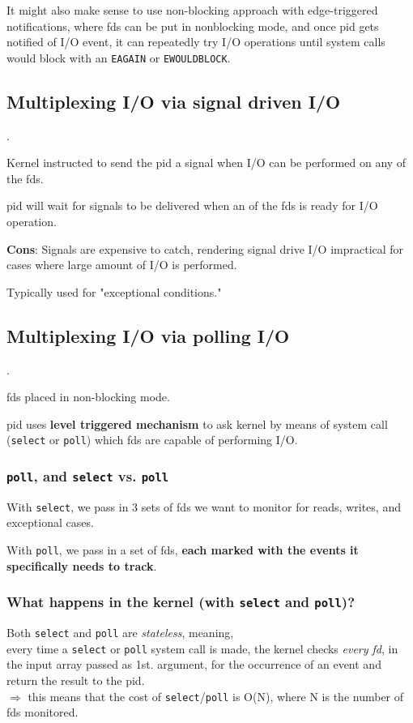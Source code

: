 \documentclass[10pt]{amsart}
\begin{document}
\begin{multicols*}{2}
It might also make sense to use non-blocking approach with edge-triggered notifications, where fds can be put in nonblocking mode, and once pid gets notified of I/O event, it can repeatedly try I/O operations until system calls would block with an \texttt{EAGAIN} or \texttt{EWOULDBLOCK}. 

\subsection{Multiplexing I/O via signal driven I/O}.

Kernel instructed to send the pid a signal when I/O can be performed on any of the fds.

pid will wait for signals to be delivered when an of the fds is ready for I/O operation.

\textbf{Cons}: Signals are expensive to catch, rendering signal drive I/O impractical for cases where large amount of I/O is performed.

Typically used for "exceptional conditions."

\subsection{Multiplexing I/O via polling I/O}.

fds placed in non-blocking mode.

pid uses \textbf{level triggered mechanism} to ask kernel by means of system call (\texttt{select} or \texttt{poll}) which fds are capable of performing I/O. 

\subsubsection{\texttt{poll}, and \texttt{select} vs. \texttt{poll} }

With \texttt{select}, we pass in 3 sets of fds we want to monitor for reads, writes, and exceptional cases.

With \texttt{poll}, we pass in a set of fds, \textbf{each marked with the events it specifically needs to track}.

\subsubsection{What happens in the kernel (with \texttt{select} and \texttt{poll})?}

Both \texttt{select} and \texttt{poll} are \emph{stateless}, meaning, \\
every time a \texttt{select} or \texttt{poll} system call is made, the kernel checks \emph{every fd}, in the input array passed as 1st. argument, for the occurrence of an event and return the result to the pid. \\
$\Longrightarrow$ this means that the cost of \texttt{select}/\texttt{poll} is O(N), where N is the number of fds monitored.


\end{multicols*}
\end{document}
